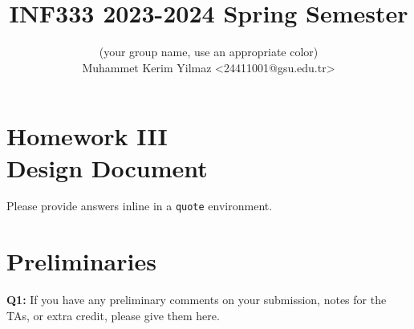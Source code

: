 \documentclass[a4paper,11pt]{paper}
\title{INF333 2023-2024 Spring Semester}
\author{
\textbf{\color{blue}{Şirinler}} {\small(your group name, use an appropriate color)}
\\ Muhammet Kerim Yilmaz <24411001@gsu.edu.tr>
}
\begin{document}
\maketitle

\section*{\LARGE Homework III \\
Design Document}

Please provide answers inline in a \texttt{quote} environment.


\section{Preliminaries}

\textbf{Q1:} If you have any preliminary comments on your submission, notes for the TAs, or extra credit, please give them here.
\end{document}
